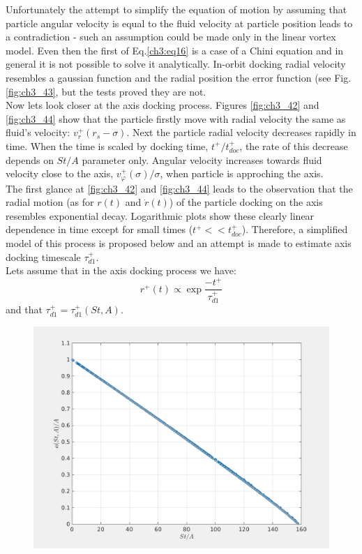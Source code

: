 \documentclass[../main.tex]{subfiles}
\begin{document}
Unfortunately the attempt to simplify the equation of motion by assuming that particle angular velocity is equal to the fluid velocity at particle position leads to a contradiction - such an assumption could be made only in the linear vortex model. Even then the first of Eq.\ref{ch3:eq16} is a case of a Chini equation and in general it is not possible to solve it analytically. In-orbit docking radial velocity resembles a gaussian function and the radial position the error function (see Fig.\ref{fig:ch3_43}, but the tests proved they are not.\\
Now lets look closer at the axis docking process. Figures \ref{fig:ch3_42} and \ref{fig:ch3_44} show that  the particle firstly move with radial velocity the same as fluid's velocity: $v^+_r(r_s-\sigma)$. Next the particle radial velocity decreases rapidly in time. When the time is scaled by docking time, $t^+/t^+_{doc}$, the rate of this decrease depends on $St/A$ parameter only. Angular velocity increases towards fluid velocity close to the axis, $v^+_{\varphi}(\sigma)/\sigma$, when particle is approching the axis.\\
\noindent The first glance at \ref{fig:ch3_42} and \ref{fig:ch3_44} leads to the observation that the radial motion (as for $r(t)$ and $\dot{r}(t)$) of the particle docking on the axis resembles exponential decay. Logarithmic plots show these clearly linear dependence in time except for small times ($t^+<<t^+_{doc}$). Therefore, a simplified model of this process is proposed below and an attempt is made to estimate axis docking timescale $\tau^+_{d1}$.\\
Lets assume that in the axis docking process we have:
\begin{equation}
r^+(t) \propto \exp \frac{-t^+}{\tau^+_{d1}}
\label{ch3:eq22}
\end{equation}
and that $\tau^+_{d1}=\tau^+_{d1}(St,A)$.
\begin{figure}
\centering
\noindent \includegraphics[width=30pc]{gfx/tau_d1_fit_vs_StA.png}
\caption{}
\label{fig:ch3_451}
\end{figure}
\end{document}
